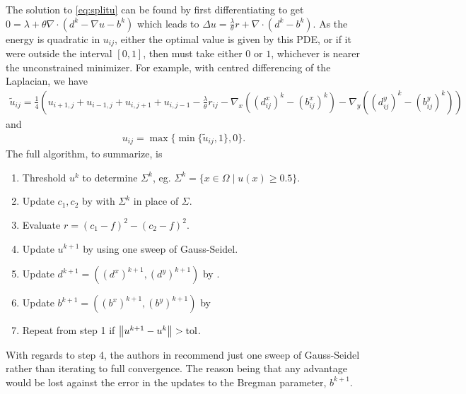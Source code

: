The solution to \eqref{eq:splitu} can be found by first differentiating to get $0 = \lambda  +\theta  \nabla \cdot ( d^k - \nabla u - b^k)$ which leads to $\Delta u = \frac{\lambda}{\theta} r + \nabla \cdot (d^k - b^k)$. As the energy is quadratic in $u_{ij}$, either the optimal value is given by this PDE, or if it were outside the interval $[0,1]$, then must take either $0$ or $1$, whichever is nearer the unconstrained minimizer. For example, with centred differencing of the Laplacian, we have 
\begin{align}
\widetilde u_{ij} = \frac{1}{4}\left(
u_{i+1,j} + u_{i-1,j} + u_{i,j+1} + u_{i,j-1} 
- \frac{\lambda}{\theta} r_{ij}
- \nabla_x ((d^x_{ij})^k - (b^x_{ij})^k)
- \nabla_y((d^y_{ij})^k - (b^y_{ij})^k)
\right) 
\label{eq:sbuij}
\end{align}
and 
\begin{align}
u_{ij}  = \max \{ \min\{ \widetilde u_{ij}, 1 \} , 0 \}.
\label{eq:sbuij2}
\end{align}
The full algorithm, to summarize, is
\begin{enumerate}
	\item Threshold $u^k$ to determine $\Sigma^k$, eg. $\Sigma^k = \{x\in\Omega \mid u(x) \geq 0.5 \}$.
	\item Update $c_1, c_2$ by  with $\Sigma^k$ in place of $\Sigma$.
	
	\item Evaluate $r = (c_1- f)^2 - (c_2 - f)^2$.

	\item Update $u^{k+1}$ by  using one sweep of Gauss-Seidel.
	
	\item Update $d^{k+1} = ((d^x)^{k+1}, (d^y)^{k+1})$ by .
	
	\item Update $b^{k+1} = ((b^x)^{k+1}, (b^y)^{k+1})$ by 
	
	\item Repeat from step 1 if $\left\lVert u^{k+1} - u^k\right\rVert > \textrm{tol}$.
\end{enumerate}
With regards to step 4, the authors in \cite{goldstein2010geometric} recommend just one sweep of Gauss-Seidel rather than iterating to full convergence. The reason being that any advantage would be lost against the error in the updates to the Bregman parameter, $b^{k+1}$.

